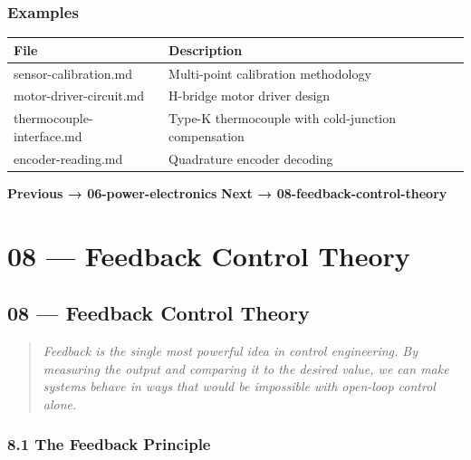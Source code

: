 \documentclass[11pt,a4paper]{book}
\begin{document}
\subsection{Examples}

\begin{center}
\begin{tabular}{|l|l|}
\hline
File & Description \\
\hline
sensor-calibration.md & Multi-point calibration methodology \\
motor-driver-circuit.md & H-bridge motor driver design \\
thermocouple-interface.md & Type-K thermocouple with cold-junction compensation \\
encoder-reading.md & Quadrature encoder decoding \\
\hline
\end{tabular}
\end{center}

\medskip\noindent\hrulefill\medskip

\textbf{Previous → 06-power-electronics}  
\textbf{Next → 08-feedback-control-theory}


\chapter{08 — Feedback Control Theory}
\section{08 — Feedback Control Theory}

\begin{quote}
\textit{Feedback is the single most powerful idea in control engineering. By measuring the output and comparing it to the desired value, we can make systems behave in ways that would be impossible with open-loop control alone.}
\end{quote}

\medskip\noindent\hrulefill\medskip

\subsection{8.1 The Feedback Principle}

\end{document}
